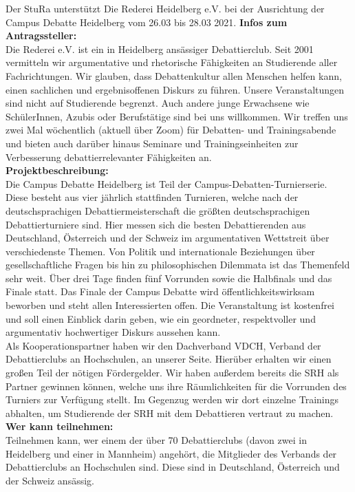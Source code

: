 {
    Der StuRa unterstützt Die Rederei Heidelberg e.V. bei der Ausrichtung der Campus Debatte Heidelberg vom 26.03 bis 28.03 2021.
}{
    \textbf{Infos zum Antragssteller:}\\
    Die Rederei e.V. ist ein in Heidelberg ansässiger Debattierclub. Seit 2001 vermitteln wir argumentative und rhetorische Fähigkeiten an Studierende aller Fachrichtungen. Wir glauben, dass Debattenkultur allen Menschen helfen kann, einen sachlichen und ergebnisoffenen Diskurs zu führen. Unsere Veranstaltungen sind nicht auf Studierende begrenzt. Auch andere junge Erwachsene wie SchülerInnen, Azubis oder Berufstätige sind bei uns willkommen. Wir treffen uns zwei Mal wöchentlich (aktuell über Zoom) für Debatten- und Trainingsabende und bieten auch darüber hinaus Seminare und Trainingseinheiten zur Verbesserung debattierrelevanter Fähigkeiten an.\\[1em]
    \textbf{Projektbeschreibung:}\\
    Die Campus Debatte Heidelberg ist Teil der Campus-Debatten-Turnierserie.  Diese besteht aus vier jährlich stattfinden Turnieren, welche nach der deutschsprachigen Debattiermeisterschaft die größten deutschsprachigen Debattierturniere sind. Hier messen sich die besten Debattierenden aus Deutschland, Österreich und der Schweiz im argumentativen Wettstreit über verschiedenste Themen. Von Politik und internationale Beziehungen über gesellschaftliche Fragen bis hin zu philosophischen Dilemmata ist das Themenfeld sehr weit. Über drei Tage finden fünf Vorrunden sowie die Halbfinals und das Finale statt.  Das Finale der Campus Debatte wird öffentlichkeitswirksam beworben und steht allen Interessierten offen. Die Veranstaltung ist kostenfrei und soll einen Einblick darin geben, wie ein geordneter, respektvoller und argumentativ hochwertiger Diskurs aussehen kann.\\
    Als Kooperationspartner haben wir den Dachverband VDCH, Verband der Debattierclubs an Hochschulen, an unserer Seite. Hierüber erhalten wir einen großen Teil der nötigen Fördergelder. Wir haben außerdem bereits die SRH als Partner gewinnen können, welche uns ihre Räumlichkeiten für die Vorrunden des Turniers zur Verfügung stellt. Im Gegenzug werden wir dort einzelne Trainings abhalten, um Studierende der SRH mit dem Debattieren vertraut zu machen.\\[1em]
    \textbf{Wer kann teilnehmen:}\\
    Teilnehmen kann, wer einem der über 70 Debattierclubs (davon zwei in Heidelberg und einer in Mannheim) angehört, die Mitglieder des Verbands der Debattierclubs an Hochschulen sind. Diese sind in Deutschland, Österreich und der Schweiz ansässig.\\
}
